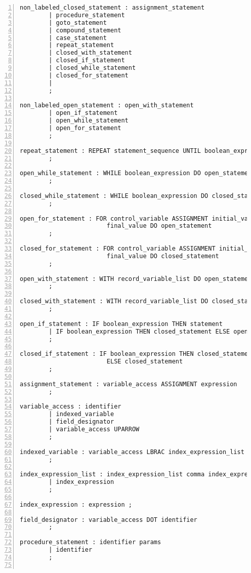\begin{Verbatim}[numbers=left]
non_labeled_closed_statement : assignment_statement
        | procedure_statement
        | goto_statement
        | compound_statement
        | case_statement
        | repeat_statement
        | closed_with_statement
        | closed_if_statement
        | closed_while_statement
        | closed_for_statement
        |
        ;

non_labeled_open_statement : open_with_statement
        | open_if_statement
        | open_while_statement
        | open_for_statement
        ;

repeat_statement : REPEAT statement_sequence UNTIL boolean_expression
        ;

open_while_statement : WHILE boolean_expression DO open_statement
        ;

closed_while_statement : WHILE boolean_expression DO closed_statement
        ;

open_for_statement : FOR control_variable ASSIGNMENT initial_value direction
                        final_value DO open_statement
        ;

closed_for_statement : FOR control_variable ASSIGNMENT initial_value direction
                        final_value DO closed_statement
        ;

open_with_statement : WITH record_variable_list DO open_statement
        ;

closed_with_statement : WITH record_variable_list DO closed_statement
        ;

open_if_statement : IF boolean_expression THEN statement
        | IF boolean_expression THEN closed_statement ELSE open_statement
        ;

closed_if_statement : IF boolean_expression THEN closed_statement
                        ELSE closed_statement
        ;

assignment_statement : variable_access ASSIGNMENT expression
        ;

variable_access : identifier
        | indexed_variable
        | field_designator
        | variable_access UPARROW
        ;

indexed_variable : variable_access LBRAC index_expression_list RBRAC
        ;

index_expression_list : index_expression_list comma index_expression
        | index_expression
        ;

index_expression : expression ;

field_designator : variable_access DOT identifier
        ;

procedure_statement : identifier params
        | identifier
        ;


\end{Verbatim}
